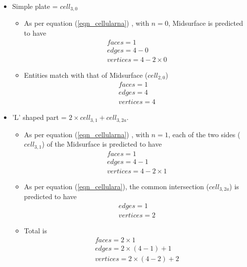 \begin{itemize}
[noitemsep,topsep=2pt,parsep=2pt,partopsep=2pt,leftmargin=*]

\item Simple plate =  $cell_{3,0}$
	\begin{itemize}
	[noitemsep,topsep=2pt,parsep=2pt,partopsep=2pt,leftmargin=*]
	\item As per equation (\ref{eqn_cellularna}) , with $n=0$, Midsurface is predicted to have 
	\begin{align*}
	faces=1\\edges=4-0\\vertices=4- 2\times0
	\end{align*}

	\item Entities match with that of Midsurface ($cell_{2,0}$) 
		\begin{align*}
		faces=1\\edges=4\\vertices=4
		\end{align*}
	 
	\end{itemize}

\item 'L' shaped part =  $2 \times cell_{3,1} + cell_{3,2a}$. 

\begin{itemize}
[noitemsep,topsep=2pt,parsep=2pt,partopsep=2pt,leftmargin=*]

\item As per equation (\ref{eqn_cellularna}) , with $n=1$, each of the two sides ($cell_{3,1}$) of the Midsurface is predicted to have  
	\begin{align*}
	faces=1\\edges=4-1\\vertices=4-2\times 1
	\end{align*}
\item As per equation (\ref{eqn_cellulara}), the common intersection ($cell_{3,2a}$) is predicted to have 
	\begin{align*}
	edges=1\\vertices=2
	\end{align*}

\item Total is 
	\begin{align*}
	faces=2\times1\\edges=2\times(4-1) + 1\\ vertices=2\times(4-2) + 2
	\end{align*}


\end{itemize}
\end{itemize}
